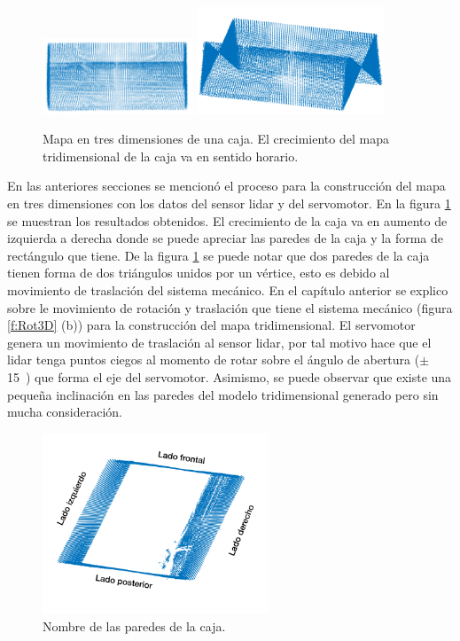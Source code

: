 \begin{figure}
  \includegraphics[width=0.40\textwidth]{images/caja3D_8.png}
  \includegraphics[width=0.50\textwidth]{images/caja3D_9.png}
  \captionsetup{font=footnotesize}
  \caption{Mapa en tres dimensiones de una caja. El crecimiento del mapa tridimensional 
  de la caja va en sentido horario.}
  \label{fig:Caja3D}
\end{figure}

En las anteriores secciones se mencionó el proceso para la construcción del mapa en 
tres dimensiones con los datos del sensor lidar y del servomotor. En la figura 
\ref{fig:Caja3D} se muestran los resultados obtenidos. El crecimiento de la caja va en
aumento de izquierda a derecha donde se puede apreciar las paredes de la caja y la forma
de rectángulo que tiene. De la figura \ref{fig:Caja3D} se puede notar que dos paredes de 
la caja tienen forma de dos triángulos unidos por un vértice, esto es debido al movimiento 
de traslación del sistema mecánico. En el capítulo anterior se explico sobre le movimiento 
de rotación y traslación que tiene el sistema mecánico (figura \ref{f:Rot3D} (b)) para la 
construcción del mapa tridimensional. El servomotor genera un movimiento de traslación al 
sensor lidar, por tal motivo hace que el lidar tenga puntos ciegos al momento de rotar 
sobre el ángulo de abertura ($\pm$ 15\grad~) que forma el eje del servomotor. Asimismo,
se puede observar que existe una pequeña inclinación en las paredes del modelo 
tridimensional generado pero sin mucha consideración.

\begin{figure}
  \centering \footnotesize
  \includegraphics[width=0.60\textwidth]{images/lados_caja.png}
  \captionsetup{font=footnotesize}
  \caption{Nombre de las paredes de la caja.}
  \label{fig:paredCaja}
\end{figure}

